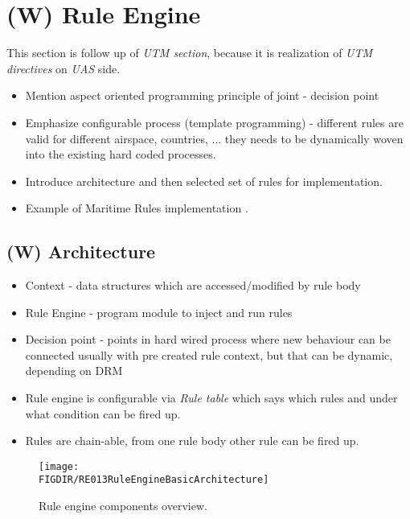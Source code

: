 \section{(W) Rule Engine}\label{sec:ruleEngine}
    \noindent This section is follow up of \emph{UTM section}, because it is realization of \emph{UTM directives} on \emph{UAS} side.
    \begin{itemize}
        \item Mention aspect oriented programming principle of joint - decision point
        \item Emphasize configurable process (template programming) - different rules are valid for different airspace, countries, ... they needs to be dynamically woven into the existing hard coded processes. 
        \item Introduce architecture and then selected set of rules for implementation.
		\item Example of Maritime Rules implementation \cite{benjamin2006navigation}.
    \end{itemize}
    
\subsection{(W) Architecture}
    \begin{itemize}
        \item Context - data structures which are accessed/modified by rule body 
        \item Rule Engine - program module to inject and run rules
        \item Decision point - points in hard wired process where new behaviour can be connected usually with pre created rule context, but that can be dynamic, depending on DRM
        \item Rule engine is configurable via \emph{Rule table} which says which rules and under what condition can be fired up.
        \item Rules are chain-able, from one rule body other rule can be fired up.
    \end{itemize}
    \begin{figure}[H]
        \centering
        \texttt{[image: \\FIGDIR/RE013RuleEngineBasicArchitecture]}
        \caption{Rule engine components overview.}
        \label{fig:RuleEngineBasicArchitecture}
    \end{figure}
    
